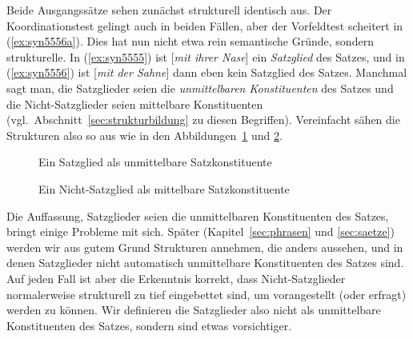 Beide Ausgangssätze sehen zunächst strukturell identisch aus.
Der Koordinationstest gelingt auch in beiden Fällen, aber der Vorfeldtest scheitert in (\ref{ex:syn5556a}).
Dies hat nun nicht etwa rein semantische Gründe, sondern strukturelle.
In (\ref{ex:syn5555}) ist [\textit{mit ihrer Nase}] ein \textit{Satzglied} des Satzes, und in (\ref{ex:syn5556}) ist [\textit{mit der Sahne}] dann eben kein Satzglied des Satzes.
Manchmal sagt man, die Satzglieder seien die \textit{unmittelbaren Konstituenten} des Satzes und die Nicht-Satzglieder seien mittelbare Konstituenten (vgl.\ Abschnitt~\ref{sec:strukturbildung} zu diesen Begriffen).
Vereinfacht sähen die Strukturen also so aus wie in den Abbildungen~\ref{fig:unmittelbarekonstituente} und \ref{fig:mittelbarekonstituente}.

\begin{figure}[!htbp]
  \centering
  \caption{Ein Satzglied als unmittelbare Satzkonstituente}
  \label{fig:unmittelbarekonstituente}
\end{figure}

\begin{figure}[!htbp]
  \centering
  \caption{Ein Nicht-Satzglied als mittelbare Satzkonstituente}
  \label{fig:mittelbarekonstituente}
\end{figure}

Die Auffassung, Satzglieder seien die unmittelbaren Konstituenten des Satzes, bringt einige Probleme mit sich.
Später (Kapitel~\ref{sec:phrasen} und \ref{sec:saetze}) werden wir aus gutem Grund Strukturen annehmen, die anders aussehen, und in denen Satzglieder nicht automatisch unmittelbare Konstituenten des Satzes sind.
Auf jeden Fall ist aber die Erkenntnis korrekt, dass Nicht-Satzglieder normalerweise strukturell zu tief eingebettet sind, um \zB vorangestellt (oder erfragt) werden zu können.
Wir definieren die Satzglieder also nicht als unmittelbare Konstituenten des Satzes, sondern sind etwas vorsichtiger.


